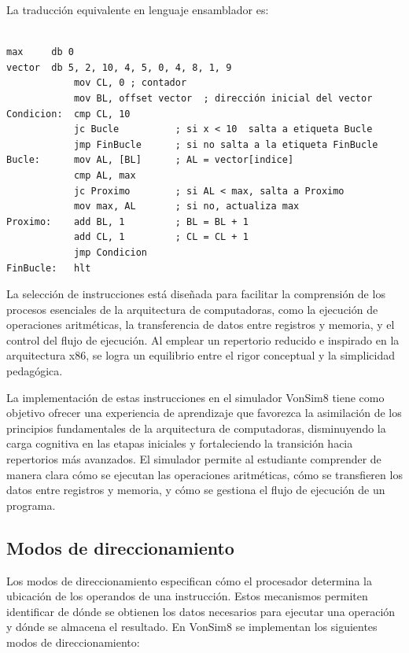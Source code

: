 \documentclass[12pt,oneside]{templates/unerthesis}
\begin{document}
La traducción equivalente en lenguaje ensamblador es:

\begin{lstlisting}[breaklines=true]

max     db 0
vector  db 5, 2, 10, 4, 5, 0, 4, 8, 1, 9
            mov CL, 0 ; contador
            mov BL, offset vector  ; dirección inicial del vector
Condicion:  cmp CL, 10 
            jc Bucle          ; si x < 10  salta a etiqueta Bucle
            jmp FinBucle      ; si no salta a la etiqueta FinBucle
Bucle:      mov AL, [BL]      ; AL = vector[indice] 
            cmp AL, max
            jc Proximo        ; si AL < max, salta a Proximo
            mov max, AL       ; si no, actualiza max
Proximo:    add BL, 1         ; BL = BL + 1 
            add CL, 1         ; CL = CL + 1            
            jmp Condicion 
FinBucle:   hlt
\end{lstlisting}

La selección de instrucciones está diseñada para facilitar la comprensión de los procesos esenciales de la arquitectura de computadoras, como la ejecución de operaciones aritméticas, la transferencia de datos entre registros y memoria, y el control del flujo de ejecución. Al emplear un repertorio reducido e inspirado en la arquitectura x86, se logra un equilibrio entre el rigor conceptual y la simplicidad pedagógica.

La implementación de estas instrucciones en el simulador VonSim8 tiene como objetivo ofrecer una experiencia de aprendizaje que favorezca la asimilación de los principios fundamentales de la arquitectura de computadoras, disminuyendo la carga cognitiva en las etapas iniciales y fortaleciendo la transición hacia repertorios más avanzados. El simulador permite al estudiante comprender de manera clara cómo se ejecutan las operaciones aritméticas, cómo se transfieren los datos entre registros y memoria, y cómo se gestiona el flujo de ejecución de un programa.

\hypertarget{modos-de-direccionamiento-1}{%
\subsection{Modos de direccionamiento}\label{modos-de-direccionamiento-1}}

Los modos de direccionamiento especifican cómo el procesador determina la ubicación de los operandos de una instrucción. Estos mecanismos permiten identificar de dónde se obtienen los datos necesarios para ejecutar una operación y dónde se almacena el resultado. En VonSim8 se implementan los siguientes modos de direccionamiento:
\end{document}
